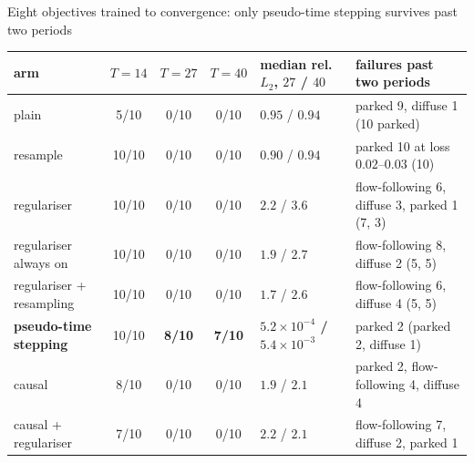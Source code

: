 \documentclass[aspectratio=169,10pt]{beamer}
\newcommand{\hl}[1]{{\color{accent}\textbf{#1}}}
\begin{document}
\begin{frame}[shrink=25]{Eight objectives trained to convergence: only pseudo-time stepping survives past two periods}
  \vspace{2mm}
  \centering\scriptsize
  \begin{tabular}{@{}lcccll@{}}
    \toprule
    arm & $T = 14$ & $T = 27$ & $T = 40$ & median rel.\ $L_2$, $27$ / $40$ & failures past two periods \\
    \midrule
    plain & 5/10 & 0/10 & 0/10 & $0.95$ / $0.94$ & parked 9, diffuse 1 (10 parked) \\
    resample & 10/10 & 0/10 & 0/10 & $0.90$ / $0.94$ & parked 10 at loss $0.02$--$0.03$ (10) \\
    regulariser & 10/10 & 0/10 & 0/10 & $2.2$ / $3.6$ & flow-following 6, diffuse 3, parked 1 (7, 3) \\
    regulariser always on & 10/10 & 0/10 & 0/10 & $1.9$ / $2.7$ & flow-following 8, diffuse 2 (5, 5) \\
    regulariser + resampling & 10/10 & 0/10 & 0/10 & $1.7$ / $2.6$ & flow-following 6, diffuse 4 (5, 5) \\
    \hl{pseudo-time stepping} & 10/10 & \hl{8/10} & \hl{7/10} & \hl{$5.2\times10^{-4}$ / $5.4\times10^{-3}$} & parked 2 (parked 2, diffuse 1) \\
    causal & 8/10 & 0/10 & 0/10 & $1.9$ / $2.1$ & parked 2, flow-following 4, diffuse 4 \\
    causal + regulariser & 7/10 & 0/10 & 0/10 & $2.2$ / $2.1$ & flow-following 7, diffuse 2, parked 1 \\
    \bottomrule
  \end{tabular}
  \vspace{3mm}


\end{frame}
\end{document}
